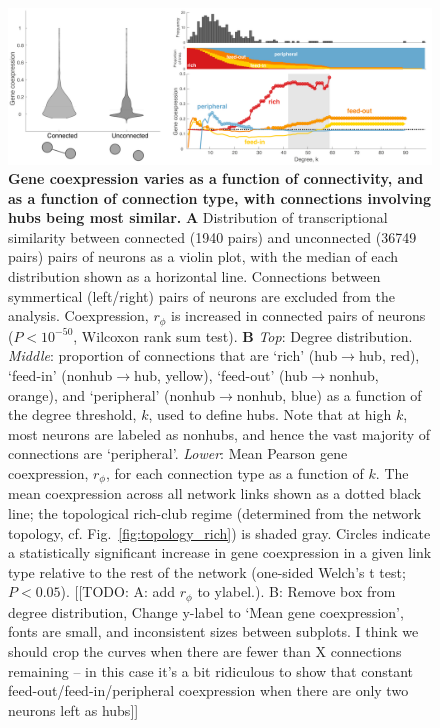 \documentclass[10pt,letterpaper]{article}
\begin{document}
 \begin{figure}[h]
 \centering
    \includegraphics[width=1\textwidth]{MeanCoexpression.pdf}
 \caption{{\bf Gene coexpression varies as a function of connectivity, and as a function of connection type, with connections involving hubs being most similar.}
\textbf{A} Distribution of transcriptional similarity between connected (1940 pairs) and unconnected (36749 pairs) pairs of neurons as a violin plot, with the median of each distribution shown as a horizontal line. Connections between symmertical (left/right) pairs of neurons are excluded from the analysis.
Coexpression, $r_\phi$ is increased in connected pairs of neurons ($P < 10^{-50}$, Wilcoxon rank sum test).
\textbf{B}
\emph{Top}: Degree distribution.
\emph{Middle}: proportion of connections that are `rich' (hub$\rightarrow$hub, red), `feed-in' (nonhub$\rightarrow$hub, yellow), `feed-out' (hub$\rightarrow$nonhub, orange), and `peripheral' (nonhub$\rightarrow$nonhub, blue) as a function of the degree threshold, $k$, used to define hubs.
Note that at high $k$, most neurons are labeled as nonhubs, and hence the vast majority of connections are `peripheral'.
\emph{Lower}: Mean Pearson gene coexpression, $r_\phi$, for each connection type as a function of $k$.
The mean coexpression across all network links shown as a dotted black line; the topological rich-club regime (determined from the network topology, cf. Fig.~\ref{fig:topology_rich}) is shaded gray.
Circles indicate a statistically significant increase in gene coexpression in a given link type relative to the rest of the network (one-sided Welch’s t test; $P < 0.05$).
[[TODO: A: add $r_\phi$ to ylabel.).
B: Remove box from degree distribution, Change y-label to `Mean gene coexpression', fonts are small, and inconsistent sizes between subplots.
I think we should crop the curves when there are fewer than X connections remaining -- in this case it's a bit ridiculous to show that constant feed-out/feed-in/peripheral coexpression when there are only two neurons
left as hubs]]}
 \label{fig:coExp}
\end{figure}
\end{document}
